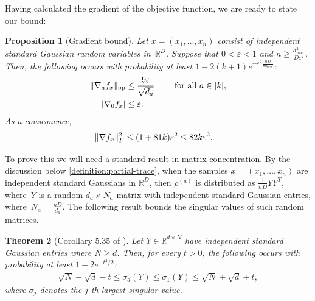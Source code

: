 \documentclass[aos]{imsart}
\newtheorem{theorem}{Theorem}[section]
\newtheorem{prop}[theorem]{Proposition}
\theoremstyle{definition}
\numberwithin{equation}{section}
\DeclareMathOperator{\op}{op}
\DeclarePairedDelimiter{\abs}{\lvert}{\rvert}
\DeclarePairedDelimiter{\norm}{\lVert}{\rVert}
\newcommand{\R}{{\mathbb{R}}}
\newcommand{\eps}{\varepsilon}
\newcommand{\rv}{x}
\def\dmax{d_{\max}}
\begin{document}
Having calculated the gradient of the objective function, we are ready to state our bound:

\begin{prop}[Gradient bound]\label{prop:gradient-bound}
Let $\rv = (\rv_1,\dots,\rv_n)$ consist of independent standard Gaussian random variables in~$\R^D$. %
Suppose that $0<\eps<1$ and $n \geq \frac{\dmax^2}{D \eps^2}$.
Then, the following occurs with probability at least $1 - 2(k+1)e^{-\eps^2 \frac{nD}{8\dmax}}$:
\begin{align*}
  \norm{\nabla_a f_x}_{\op}
&\leq \frac{9\eps}{\sqrt{d_a}}
\qquad\text{ for all $a\in[k]$}, \\
  \abs{\nabla_0 f_x} &\leq \eps.
\end{align*}
As a consequence, %
\begin{align*}
  \norm{\nabla f_x}_F^2
&\leq (1 + 81 k) \eps^2
\leq 82 k \eps^2.
\end{align*}
\end{prop}

To prove this we will need a standard result in matrix concentration.
By the discussion below \cref{definition:partial-trace}, when the samples $x=(x_1,\dots,x_n)$ are independent standard Gaussians in $\R^D$, then $\rho^{(a)}$ is distributed as $\frac1{nD} Y Y^T$, where~$Y$ is a random $d_a \times N_a$ matrix with independent standard Gaussian entries, where~$N_a = \frac{nD}{d_a}$.
The following result bounds the singular values of such random matrices.

\begin{theorem}[Corollary 5.35 of \cite{vershynin2010introduction}]\label{cor:vershynin}
Let $Y \in \R^{d \times N}$ have independent standard Gaussian entries where $N\geq d$.
Then, for every $t > 0$, the following occurs with probability at least $1 - 2 e^{-t^2/2}$:
\begin{align*}
  \sqrt{N} - \sqrt{d} - t \leq \sigma_d(Y) \leq \sigma_1(Y) \leq \sqrt{N} + \sqrt{d} + t,
\end{align*}
where $\sigma_j$ denotes the $j$-th largest singular value.
\end{theorem}
\end{document}

